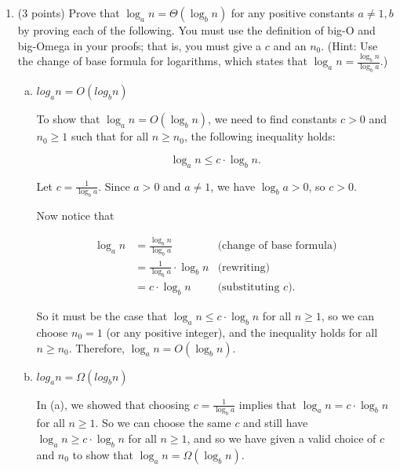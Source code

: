 \documentclass[11pt]{article}
\begin{document}
\begin{enumerate}
\item (3 points) Prove that $\log_a n = \Theta(\log_b n)$ for any positive
constants $a \neq 1, b$ by proving each of the following. You must use the
definition of big-O and big-Omega in your proofs; that is, you must give a $c$
and an $n_0$. (Hint: Use the change of base formula for logarithms, which states
that $\log_a n = \frac{\log_b n}{\log_b a}$.)

    \begin{enumerate}[(a)]
        \item $log_a n = O(log_b n)$
    \begin{Solution}
        To show that $\log_a n = O(\log_b n)$, we need to find constants $c > 0$
        and $n_0 \geq 1$ such that for all $n \geq n_0$, the following
        inequality holds:

        \[
            \log_a n \leq c \cdot \log_b n.
        \]

        Let $c = \frac{1}{\log_b a}$. Since $a > 0$ and $a \neq 1$, we have
        $\log_b a > 0$, so $c > 0$.

        Now notice that

        \begin{align*}
            \log_a n & = \frac{\log_b n}{\log_b a} & \text{(change of base formula)} \\
            & = \frac{1}{\log_b a} \cdot \log_b n & \text{(rewriting)} \\
            & = c \cdot \log_b n & \text{(substituting $c$)}.
        \end{align*}
        
        So it must be the case that $\log_a n \leq c \cdot \log_b n$ for all $n \geq 1$,
        so we can choose $n_0 = 1$ (or any positive integer), and the inequality
        holds for all $n \geq n_0$. Therefore, $\log_a n =
        O(\log_b n)$.

    \end{Solution}
        \item $log_a n = \Omega(log_b n)$
    \begin{Solution}
        In (a), we showed that choosing $c = \frac{1}{\log_b a}$ implies that
        $\log_a n = c \cdot \log_b n$ for all $n \geq 1$. So we can choose the same $c$ and still have
        $\log_a n \geq c \cdot \log_b n$ for all $n \geq 1$, and so we have given a valid choice of $c$ and $n_0$
        to show that $\log_a n = \Omega(\log_b n)$.
    \end{Solution}
    \end{enumerate} 


\end{enumerate}
\end{document}
